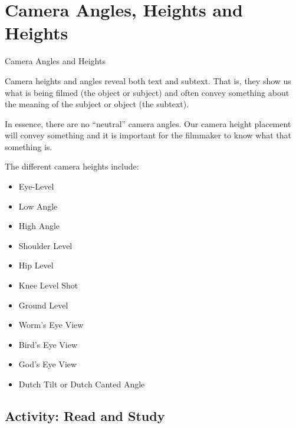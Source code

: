 \documentclass[
]{book}
\providecommand{\tightlist}{%
  \setlength{\itemsep}{0pt}\setlength{\parskip}{0pt}}
\begin{document}
\hypertarget{camera-angles-heights-and-heights}{%
\section{Camera Angles, Heights and Heights}\label{camera-angles-heights-and-heights}}

{Camera Angles and Heights}

Camera heights and angles reveal both text and subtext. That is, they show us what is being filmed (the object or subject) and often convey something about the meaning of the subject or object (the subtext).

In essence, there are no ``neutral'' camera angles. Our camera height placement will convey something and it is important for the filmmaker to know what that something is.

The different camera heights include:

\begin{itemize}
\tightlist
\item
  Eye-Level\\
\item
  Low Angle\\
\item
  High Angle\\
\item
  Shoulder Level\\
\item
  Hip Level\\
\item
  Knee Level Shot\\
\item
  Ground Level\\
\item
  Worm's Eye View\\
\item
  Bird's Eye View\\
\item
  God's Eye View\\
\item
  Dutch Tilt or Dutch Canted Angle
\end{itemize}

\hypertarget{activity-read-and-study-1}{%
\subsection*{Activity: Read and Study}\label{activity-read-and-study-1}}
\end{document}
